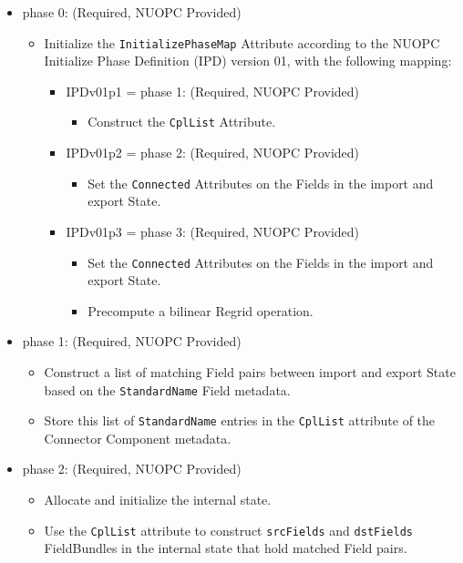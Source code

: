 \begin{itemize}
\item phase 0: ({\sc Required, NUOPC Provided})
  \begin{itemize}
  \item Initialize the {\tt InitializePhaseMap} Attribute according to the NUOPC Initialize Phase Definition (IPD) version 01, with the following mapping:
    \begin{itemize}
    \item IPDv01p1 = phase 1: ({\sc Required, NUOPC Provided})
      \begin{itemize}
      \item Construct the {\tt CplList} Attribute.
      \end{itemize}
    \item IPDv01p2 = phase 2: ({\sc Required, NUOPC Provided})
      \begin{itemize}
      \item Set the {\tt Connected} Attributes on the Fields in the import and export State.
      \end{itemize}  
    \item IPDv01p3 = phase 3: ({\sc Required, NUOPC Provided})
      \begin{itemize}
      \item Set the {\tt Connected} Attributes on the Fields in the import and export State.
      \item Precompute a bilinear Regrid operation.
      \end{itemize}  
    \end{itemize}  
  \end{itemize}  
\item phase 1: ({\sc Required, NUOPC Provided})
  \begin{itemize}
  \item Construct a list of matching Field pairs between import and export State based on the {\tt StandardName} Field metadata. 
  \item Store this list of {\tt StandardName} entries in the {\tt CplList} attribute of the Connector Component metadata.
  \end{itemize}
\item phase 2: ({\sc Required, NUOPC Provided})
  \begin{itemize}
  \item Allocate and initialize the internal state.
  \item Use the {\tt CplList} attribute to construct {\tt srcFields} and {\tt dstFields} FieldBundles in the internal state that hold matched Field pairs.

\end{itemize}
\end{itemize}
